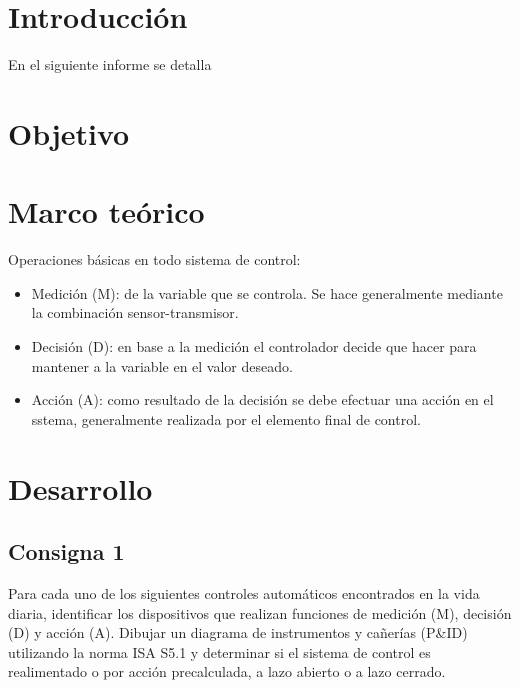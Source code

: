 
\section{Introducción}

En el siguiente informe se detalla 

\section{Objetivo}

\section{Marco teórico}


Operaciones básicas en todo sistema de control:

\begin{itemize}
    \item Medición (M): de la variable que se controla. Se hace generalmente mediante la combinación sensor-transmisor.
    \item Decisión (D): en base a la medición el controlador decide que hacer para mantener a la variable en el valor deseado.
    \item Acción (A): como resultado de la decisión se debe efectuar una acción en el sstema, generalmente realizada por el elemento final de control.
\end{itemize}

\section{Desarrollo}

\subsection{Consigna 1}

Para cada uno de los siguientes controles automáticos encontrados en la vida
diaria, identificar los dispositivos que realizan funciones de medición (M), decisión
(D) y acción (A). Dibujar un diagrama de instrumentos y cañerías (P\&ID) utilizando
la norma ISA S5.1 y determinar si el sistema de control es realimentado o por
acción precalculada, a lazo abierto o a lazo cerrado.

